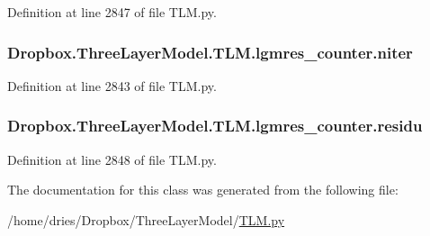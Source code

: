 Definition at line 2847 of file T\+L\+M.\+py.

\hypertarget{classDropbox_1_1ThreeLayerModel_1_1TLM_1_1lgmres__counter_a086eb28032369e4976851982e49f5168}{
\subsubsection[{niter}]{\setlength{\rightskip}{0pt plus 5cm}Dropbox.\+Three\+Layer\+Model.\+T\+L\+M.\+lgmres\+\_\+counter.\+niter}}\label{classDropbox_1_1ThreeLayerModel_1_1TLM_1_1lgmres__counter_a086eb28032369e4976851982e49f5168}


Definition at line 2843 of file T\+L\+M.\+py.

\hypertarget{classDropbox_1_1ThreeLayerModel_1_1TLM_1_1lgmres__counter_a7bf0e97e87c6fc63314345373c70e836}{
\subsubsection[{residu}]{\setlength{\rightskip}{0pt plus 5cm}Dropbox.\+Three\+Layer\+Model.\+T\+L\+M.\+lgmres\+\_\+counter.\+residu}}\label{classDropbox_1_1ThreeLayerModel_1_1TLM_1_1lgmres__counter_a7bf0e97e87c6fc63314345373c70e836}


Definition at line 2848 of file T\+L\+M.\+py.



The documentation for this class was generated from the following file\+:\begin{DoxyCompactItemize}
\item 
/home/dries/\+Dropbox/\+Three\+Layer\+Model/\hyperlink{TLM_8py}{T\+L\+M.\+py}\end{DoxyCompactItemize}
